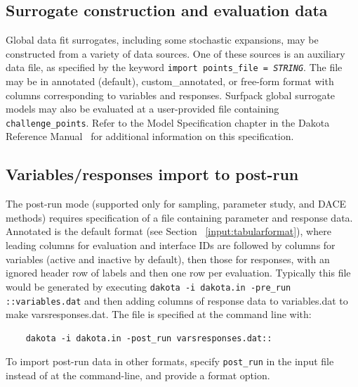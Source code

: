 \subsection{Surrogate construction and evaluation data}

Global data fit surrogates, including some stochastic expansions, may
be constructed from a variety of data sources.  One of these sources
is an auxiliary data file, as specified by the keyword \texttt{import\
  points\_file = \emph{STRING}}.  The file may be in annotated
(default), custom\_annotated, or free-form format with columns
corresponding to variables and responses.  Surfpack global surrogate
models may also be evaluated at a user-provided file containing
\texttt{challenge\_points}.  Refer to the Model Specification chapter
in the Dakota Reference Manual~\cite{RefMan} for additional
information on this specification.

\subsection{Variables/responses import to post-run}

The post-run mode (supported only for sampling, parameter study, and
DACE methods) requires specification of a file containing parameter
and response data.  Annotated is the default format (see Section
~\ref{input:tabularformat}), where leading columns for evaluation and
interface IDs are followed by columns for variables (active and
inactive by default), then those for responses, with an ignored header
row of labels and then one row per evaluation.  Typically this file
would be generated by executing \texttt{dakota -i dakota.in -pre\_run
  ::variables.dat} and then adding columns of response data to
variables.dat to make varsresponses.dat.  The file is specified at the
command line with:
\begin{small}
\begin{verbatim}
    dakota -i dakota.in -post_run varsresponses.dat::
\end{verbatim}
\end{small}
To import post-run data in other formats, specify \texttt{post\_run}
in the input file instead of at the command-line, and provide a format
option.

